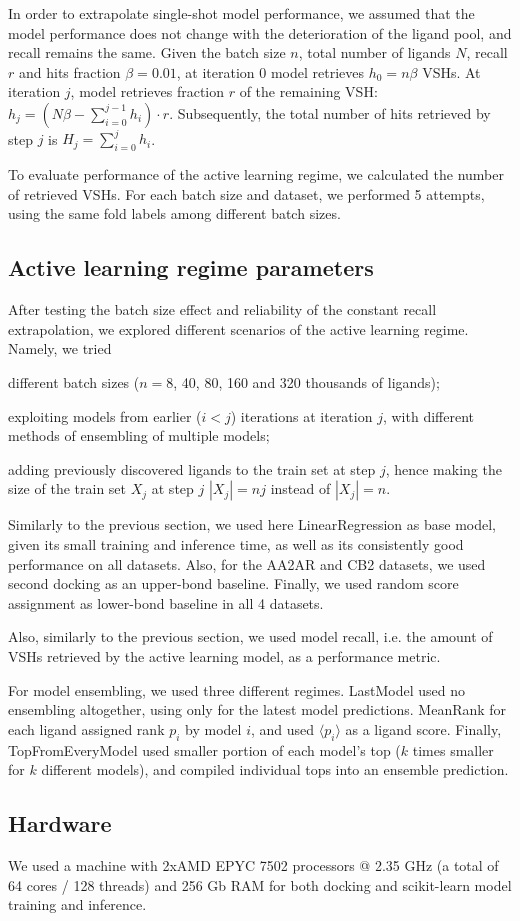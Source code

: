 In order to extrapolate single-shot model performance, we assumed that the model performance does not change with the deterioration of the ligand pool, and recall remains the same. Given the batch size $n$, total number of ligands $N$, recall $r$ and hits fraction $\beta=0.01$, at iteration 0 model retrieves $h_0 = n\beta$ VSHs. At iteration $j$, model retrieves fraction $r$ of the remaining VSH: $h_j = ( N\beta - \sum_{i=0}^{j-1}h_i ) \cdot r$. Subsequently, the total number of hits retrieved by step $j$ is $H_j = \sum_{i=0}^{j} h_i$.

To evaluate performance of the active learning regime, we calculated the number of retrieved VSHs. For each batch size and dataset, we performed 5 attempts, using the same fold labels among different batch sizes.

\subsection{Active learning regime parameters}

After testing the batch size effect and reliability of the constant recall extrapolation, we explored different scenarios of the active learning regime. Namely, we tried
\begin{enumerate*}[label=(\roman*)]
    \item different batch sizes ($n=8$, 40, 80, 160 and 320 thousands of ligands);
    \item exploiting models from earlier ($i < j$) iterations at iteration $j$, with different methods of ensembling of multiple models;
    \item adding previously discovered ligands to the train set at step $j$, hence making the size of the train set $X_j$ at step $j$ $|X_j| = nj$ instead of $|X_j|=n$.
\end{enumerate*}

Similarly to the previous section, we used here LinearRegression as base model, given its small training and inference time, as well as its consistently good performance on all datasets. Also, for the AA2AR and CB2 datasets, we used second docking as an upper-bond baseline. Finally, we used random score assignment as lower-bond baseline in all 4 datasets. 

Also, similarly to the previous section, we used model recall, i.e. the amount of VSHs retrieved by the active learning model, as a performance metric.

For model ensembling, we used three different regimes. LastModel used no ensembling altogether, using only for the latest model predictions. MeanRank for each ligand assigned rank $p_i$ by model $i$, and used $\langle p_i \rangle$ as a ligand score. Finally, TopFromEveryModel used smaller portion of each model's top ($k$ times smaller for $k$ different models), and compiled individual tops into an ensemble prediction.


\subsection{Hardware}
We used a machine with 2xAMD EPYC 7502 processors @ 2.35 GHz (a total of 64 cores / 128 threads) and 256 Gb RAM for both docking and scikit-learn model training and inference.
